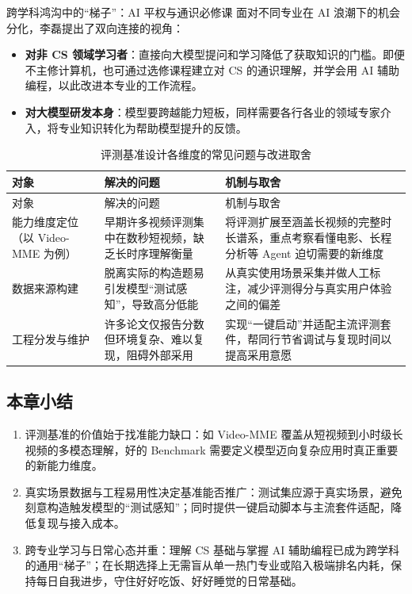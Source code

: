 \documentclass[UTF8,a4paper,11pt,fontset=fandol]{ctexart}
\begin{document}
\begin{knowledgebox}{跨学科鸿沟中的“梯子”：AI 平权与通识必修课}
面对不同专业在 AI 浪潮下的机会分化，李磊提出了双向连接的视角：
\begin{itemize}
\item \textbf{对非 CS 领域学习者}：直接向大模型提问和学习降低了获取知识的门槛。即便不主修计算机，也可通过选修课程建立对 CS 的通识理解，并学会用 AI 辅助编程，以此改进本专业的工作流程。
\item \textbf{对大模型研发本身}：模型要跨越能力短板，同样需要各行各业的领域专家介入，将专业知识转化为帮助模型提升的反馈。
\end{itemize}
\end{knowledgebox}
\begingroup\small\setlength{\LTcapwidth}{\linewidth}
\begin{longtable}{>{\raggedright\arraybackslash}p{\dimexpr(\linewidth-6\tabcolsep)/3\relax}>{\raggedright\arraybackslash}p{\dimexpr(\linewidth-6\tabcolsep)/3\relax}>{\raggedright\arraybackslash}p{\dimexpr(\linewidth-6\tabcolsep)/3\relax}}
\caption{评测基准设计各维度的常见问题与改进取舍}\\
\toprule
对象 & 解决的问题 & 机制与取舍\\\midrule
\endfirsthead
\toprule
对象 & 解决的问题 & 机制与取舍\\\midrule
\endhead
能力维度定位（以 Video-MME 为例） & 早期许多视频评测集中在数秒短视频，缺乏长时序理解衡量 & 将评测扩展至涵盖长视频的完整时长谱系，重点考察看懂电影、长程分析等 Agent 迫切需要的新维度\\[4pt]
数据来源构建 & 脱离实际的构造题易引发模型“测试感知”，导致高分低能 & 从真实使用场景采集并做人工标注，减少评测得分与真实用户体验之间的偏差\\[4pt]
工程分发与维护 & 许多论文仅报告分数但环境复杂、难以复现，阻碍外部采用 & 实现“一键启动”并适配主流评测套件，帮同行节省调试与复现时间以提高采用意愿\\[4pt]
\bottomrule\end{longtable}\endgroup
{}\subsection{本章小结}
\begin{enumerate}
\item 评测基准的价值始于找准能力缺口：如 Video-MME 覆盖从短视频到小时级长视频的多模态理解，好的 Benchmark 需要定义模型迈向复杂应用时真正重要的新能力维度。
\item 真实场景数据与工程易用性决定基准能否推广：测试集应源于真实场景，避免刻意构造触发模型的“测试感知”；同时提供一键启动脚本与主流套件适配，降低复现与接入成本。
\item 跨专业学习与日常心态并重：理解 CS 基础与掌握 AI 辅助编程已成为跨学科的通用“梯子”；在长期选择上无需盲从单一热门专业或陷入极端排名内耗，保持每日自我进步，守住好好吃饭、好好睡觉的日常基础。
\end{enumerate}
\end{document}
